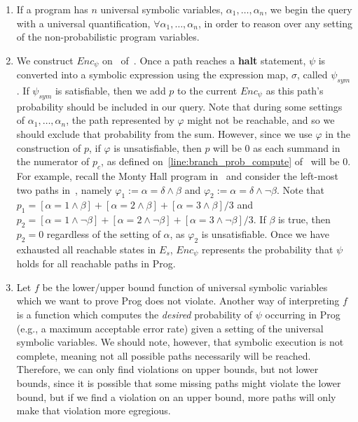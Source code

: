 \documentclass[acmsmall,review,anonymous]{acmart}\settopmatter{printfolios=true,printccs=false,printacmref=false}
\begin{document}
\begin{enumerate}
\item If a program has $n$ universal symbolic variables, $\alpha_1,\ldots,\alpha_n$, we begin the query with a universal quantification, $\forall \alpha_1,\ldots,\alpha_n$, in order to reason over any setting of the non-probabilistic program variables.


\item We construct $Enc_\psi$ on~ of~.
  Once a path reaches a \textbf{halt} statement, $\psi$ is converted into a symbolic expression using the expression map, $\sigma$, called $\psi_{sym}$.
  If $\psi_{sym}$ is satisfiable, then we add $p$ to the current $Enc_\psi$ as this path's probability should be included in our query.
  Note that during some settings of $\alpha_1,\ldots,\alpha_n$, the path represented by $\varphi$ might not be reachable, and so we should exclude that probability from the sum.
  However, since we use $\varphi$ in the construction of $p$, if $\varphi$ is unsatisfiable, then $p$ will be 0 as each summand in the numerator of $p_c$, as defined on~\cref{line:branch_prob_compute} of~ will be 0. 
  For example, recall the Monty Hall program in~ and consider the left-most two paths in~, namely $\varphi_1 := \alpha = \delta \wedge \beta$ and $\varphi_2 := \alpha = \delta \wedge \neg \beta$. 
  Note that $p_1 = [\alpha = 1 \wedge \beta] + [\alpha = 2 \wedge \beta] + [\alpha = 3 \wedge \beta]/3$ and $p_2 = [\alpha = 1 \wedge \neg\beta] + [\alpha = 2 \wedge \neg\beta] + [\alpha = 3 \wedge \neg\beta]/3$.
  If $\beta$ is true, then $p_2 = 0$ regardless of the setting of $\alpha$, as $\varphi_2$ is unsatisfiable.
  Once we have exhausted all reachable states in $E_s$, $Enc_\psi$ represents the probability that $\psi$ holds for all reachable paths in \textsf{Prog}.
\item Let $f$ be the lower/upper bound function of universal symbolic variables which we want to prove \textsf{Prog} does not violate.
  Another way of interpreting $f$ is a function which computes the \textit{desired} probability of $\psi$ occurring in \textsf{Prog} (e.g., a maximum acceptable error rate) given a setting of the universal symbolic variables.
  We should note, however, that symbolic execution is not complete, meaning not all possible paths necessarily will be reached.
  Therefore, we can only find violations on upper bounds, but not lower bounds, since it is possible that some missing paths might violate the lower bound, but if we find a violation on an upper bound, more paths will only make that violation more egregious.
\end{enumerate}
\end{document}
